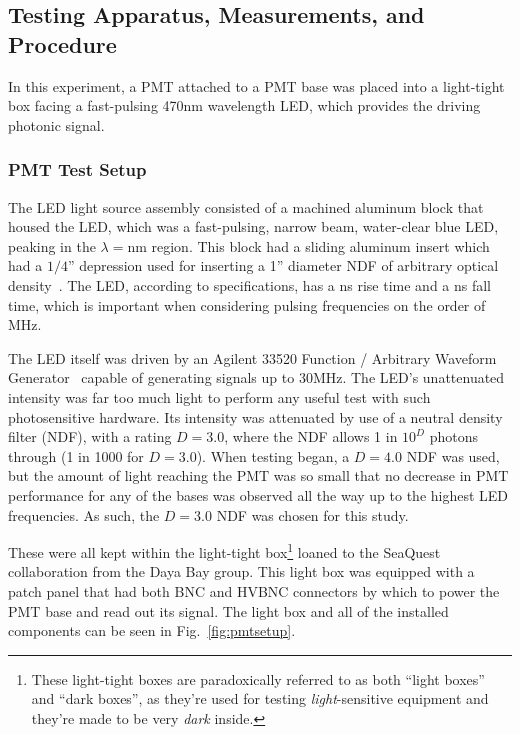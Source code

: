 \subsection{Testing Apparatus, Measurements, and Procedure}

In this experiment, a PMT attached to a PMT base was placed into a light-tight box facing a fast-pulsing 470nm wavelength LED, which provides the driving photonic signal. 

\subsubsection{PMT Test Setup}

The LED light source assembly consisted of a machined aluminum block that housed the LED, which was a fast-pulsing, narrow beam, water-clear blue LED, peaking in the $\lambda =$\unit[450]{nm} region. This block had a sliding aluminum insert which had a $1/4$'' depression used for inserting a 1'' diameter NDF of arbitrary optical density~\cite{ames1998measurement}. The LED, according to specifications, has a \unit[N]{ns} rise time and a \unit[N]{ns} fall time, which is important when considering pulsing frequencies on the order of \unit[30]{MHz}.

The LED itself was driven by an Agilent 33520 Function / Arbitrary Waveform Generator~\cite{agilent:33520} capable of generating signals up to 30MHz. The LED's unattenuated intensity was far too much light to perform any useful test with such photosensitive hardware. Its intensity was attenuated by use of a neutral density filter (NDF), with a rating $D=3.0$, where the NDF allows 1 in $10^D$ photons through (1 in 1000 for $D=3.0$). When testing began, a $D=4.0$ NDF was used, but the amount of light reaching the PMT was so small that no decrease in PMT performance for any of the bases was observed all the way up to the highest LED frequencies. As such, the $D=3.0$ NDF was chosen for this study.

These were all kept within the light-tight box\footnote{These light-tight boxes are paradoxically referred to as both ``light boxes'' and ``dark boxes'', as they're used for testing \emph{light}-sensitive equipment and they're made to be very \emph{dark} inside.} loaned to the SeaQuest collaboration from the Daya Bay group. This light box was equipped with a patch panel that had both BNC and HVBNC connectors by which to power the PMT base and read out its signal. The light box and all of the installed components can be seen in Fig.~\ref{fig:pmtsetup}.

